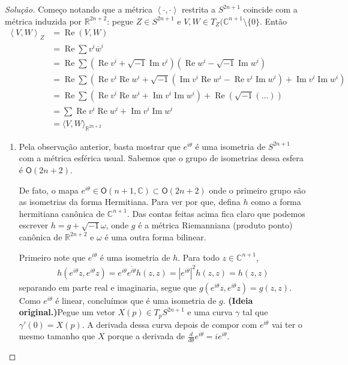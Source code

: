 \begin{proof}[Solução]\leavevmode
	Começo notando que a métrica \(\left<\cdot,\cdot\right>\) restrita a \(S^{2n+1}\) coincide com a métrica induzida por \(\mathbb{R}^{2n+2}\): pegue \(Z \in S^{2n+1}\) e \(V,W \in T_Z(\mathbb{C}^{n+1}\setminus\{0\}\). Então
	\begin{align*}
\left<V,W\right>_Z&=\operatorname{Re}( V,W)\\ &= \operatorname{Re}\sum v^i\overline{w}^i \\
&= \operatorname{Re}\sum \left(\operatorname{Re} v^i + \sqrt{-1}\operatorname{Im} v^i\right)\left(\operatorname{Re} w^i - \sqrt{-1} \operatorname{Im} w^i\right) \\
&= \operatorname{Re}\sum\left(\operatorname{Re} v^i\operatorname{Re} w^i + \sqrt{-1}(\operatorname{Im} v^i\operatorname{Re} w^i-\operatorname{Re} v^i\operatorname{Im} w^i ) + \operatorname{Im} v^i\operatorname{Im} w^i\right) \\
&= \operatorname{Re}\sum\left(\operatorname{Re} v^i\operatorname{Re} w^i + \operatorname{Im} v^i\operatorname{Im} w^i\right) + \operatorname{Re}\left(\sqrt{-1}(\dots)\right) \\
&= \sum \operatorname{Re} v^i\operatorname{Re} w^i + \operatorname{Im} v^i\operatorname{Im} w^i \\
&= \langle V,W\rangle_{\mathbb{R}^{2n+2}}
\end{align*}
\begin{enumerate}[label=(\alph*)]
\item Pela observação anterior, basta mostrar que \(e^{i\theta}\) é uma isometria de \(S^{2n+1}\) com a métrica esférica usual. Sabemos que o grupo de isometrias dessa esfera é \(\mathsf{O}(2n+2)\).

	De fato, o mapa \(e^{i\theta} \in \mathsf{O}(n+1,\mathbb{C})\subset\mathsf{O}(2n+2)\) onde o primeiro grupo são as isometrias da forma Hermitiana. Para ver por que, defina \(h\) como a forma hermitiana canônica de \(\mathbb{C}^{n+1}\). Das contas feitas acima fica claro que podemos escrever \(h=g+\sqrt{-1}\omega\), onde \(g\) é a métrica Riemanniana (produto ponto) canônica de \(\mathbb{R}^{2n+2}\) e \(\omega\) é uma outra forma bilinear.

Primeiro note que \(e^{i\theta}\) é uma isometria de \(h\). Para todo \(z \in \mathbb{C}^{n+1}\),
\begin{align*}
h(e^{i\theta}z,e^{i\theta}z)=e^{i\theta}\overline{e^{i\theta}}h(z,z)=|e^{i\theta}|^2h(z,z)=h(z,z)
\end{align*}
separando em parte real e imaginaria, segue que \(g(e^{i\theta}z,e^{i\theta}z)=g(z,z)\). Como \(e^{i\theta}\) é linear, concluímos que é uma isometria de \(g\).
\iffalse
	\textbf{(Ideia original.)}Pegue um vetor \(X(p) \in T_pS^{2n+1}\) e uma curva \(\gamma\) tal que \(\gamma'(0)=X(p)\). A derivada dessa curva depois de compor com \(e^{i\theta}\) vai ter o mesmo tamanho que \(X\) porque a derivada de \(\frac{d}{d\theta}e^{i\theta}=ie^{i\theta}\).


\end{enumerate}
\end{proof}
